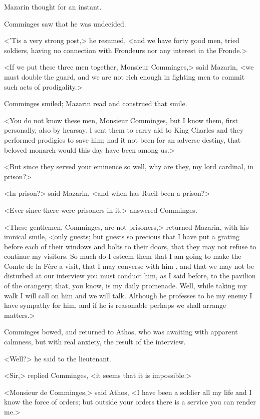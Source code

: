 Mazarin thought for an instant.

Comminges saw that he was undecided.

<'Tis a very strong post,> he resumed, <and we have forty good men, tried soldiers, having no connection with Frondeurs nor any interest in the Fronde.>

<If we put these three men together, Monsieur Comminges,> said Mazarin, <we must double the guard, and we are not rich enough in fighting men to commit such acts of prodigality.>

Comminges smiled; Mazarin read and construed that smile.

<You do not know these men, Monsieur Comminges, but I know them, first personally, also by hearsay. I sent them to carry aid to King Charles and they performed prodigies to save him; had it not been for an adverse destiny, that beloved monarch would this day have been among us.>

<But since they served your eminence so well, why are they, my lord cardinal, in prison?>

<In prison?> said Mazarin, <and when has Rueil been a prison?>

<Ever since there were prisoners in it,> answered Comminges.

<These gentlemen, Comminges, are not prisoners,> returned Mazarin, with his ironical smile, <only guests; but guests so precious that I have put a grating before each of their windows and bolts to their doors, that they may not refuse to continue my visitors. So much do I esteem them that I am going to make the Comte de la Fère a visit, that I may converse with him , and that we may not be disturbed at our interview you must conduct him, as I said before, to the pavilion of the orangery; that, you know, is my daily promenade. Well, while taking my walk I will call on him and we will talk. Although he professes to be my enemy I have sympathy for him, and if he is reasonable perhaps we shall arrange matters.>

Comminges bowed, and returned to Athos, who was awaiting with apparent calmness, but with real anxiety, the result of the interview.

<Well?> he said to the lieutenant.

<Sir,> replied Comminges, <it seems that it is impossible.>

<Monsieur de Comminges,> said Athos, <I have been a soldier all my life and I know the force of orders; but outside your orders there is a service you can render me.>

